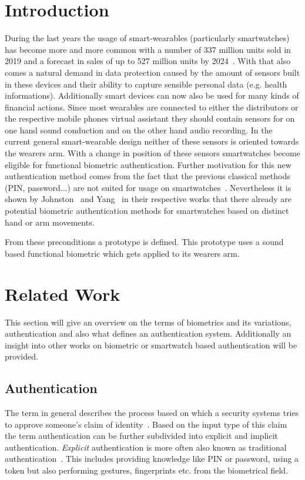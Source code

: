 \section{Introduction}
During the last years the usage of smart-wearables (particularly smartwatches) has become more and more common with a number of 337 million units sold in 2019 and a forecast in sales of up to 527 million units by 2024~\cite{tenzer}.
With that also comes a natural demand in data protection caused by the amount of sensors built in these devices and their ability to capture sensible personal data (e.g. health informations).
Additionally smart devices can now also be used for many kinds of financial actions.
Since most wearables are connected to either the distributors or the respective mobile phones virtual assistant they should contain sensors for on one hand sound conduction and on the other hand audio recording.
In the current general smart-wearable design neither of these sensors is oriented towards the wearers arm.
With a change in position of these sensors smartwatches become eligible for functional biometric authentication.
Further motivation for this new authentication method comes from the fact that the previous classical methods (PIN, password...) are not suited for usage on smartwatches~\cite{xu2017gait}.   
Nevertheless it is shown by Johnston~\cite{johnston2015smartwatch} and Yang~\cite{yang2015motionauth} in their respective works that there already are potential biometric authentication methods for smartwatches based on distinct hand or arm movements. 

From these preconditions a prototype is defined. This prototype uses a sound based functional biometric which gets applied to its wearers arm. 

\section{Related Work}
This section will give an overview on the terms of biometrics and its variations, authentication and also what defines an authentication system.
Additionally an insight into other works on biometric or smartwatch based authentication will be provided. 

\subsection{Authentication}
The term in general describes the process based on which a security systems tries to approve someone's claim of identity~\cite{bhattacharyya2009biometric}.
Based on the input type of this claim the term authentication can be further subdivided into explicit and implicit authentication.
\textit{Explicit} authentication is more often also known as traditional authentication~\cite{ranjan2016automatic}.
This includes providing knowledge like PIN or password, using a token but also performing gestures, fingerprints etc. from the biometrical field.

